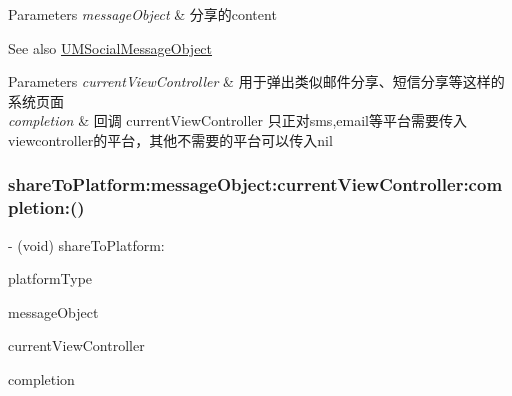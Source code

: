 \begin{DoxyParams}{Parameters}
{\em message\+Object} & 分享的content \\
\hline
\end{DoxyParams}
\begin{DoxySeeAlso}{See also}
\mbox{\hyperlink{interface_u_m_social_message_object}{U\+M\+Social\+Message\+Object}} 
\end{DoxySeeAlso}

\begin{DoxyParams}{Parameters}
{\em current\+View\+Controller} & 用于弹出类似邮件分享、短信分享等这样的系统页面 \\
\hline
{\em completion} & 回调  current\+View\+Controller 只正对sms,email等平台需要传入viewcontroller的平台，其他不需要的平台可以传入nil \\
\hline
\end{DoxyParams}
\mbox{\label{interface_u_m_social_manager_afebff9032093b6e9ee8a173de3e8fe65}} 
\subsubsection{\texorpdfstring{share\+To\+Platform\+:message\+Object\+:current\+View\+Controller\+:completion\+:()}{shareToPlatform:messageObject:currentViewController:completion:()}\hspace{0.1cm}{\footnotesize\ttfamily [2/2]}}
{\footnotesize\ttfamily -\/ (void) share\+To\+Platform\+: \begin{DoxyParamCaption}\item[{(U\+M\+Social\+Platform\+Type)}]{platform\+Type }\item[{messageObject:(\mbox{\hyperlink{interface_u_m_social_message_object}{U\+M\+Social\+Message\+Object}} $\ast$)}]{message\+Object }\item[{currentViewController:(id)}]{current\+View\+Controller }\item[{completion:(U\+M\+Social\+Request\+Completion\+Handler)}]{completion }\end{DoxyParamCaption}}

